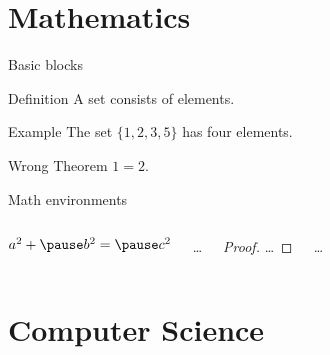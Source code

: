 \documentclass[aspectratio=1610,hyperref={pdfpagemode=FullScreen},english]{beamer} %
\begin{document}
\section{Mathematics}
\begin{frame}{Basic blocks}
  \begin{block}{Definition}
    A \alert{set} consists of elements.
  \end{block}
  \begin{exampleblock}{Example}
    The set $\{1,2,3,5\}$ has four elements.
  \end{exampleblock}
  \begin{alertblock}{Wrong Theorem}
    $1=2$.
  \end{alertblock}
\end{frame}
\begin{frame}{Math environments}
  \begin{columns}
      \begin{theorem}[Pythagorean]
        $a^{2}+ \pause b^{2}= \pause c^{2}$ 
      \end{theorem}
      \ldots
      \begin{proof}
        \ldots
      \end{proof}
      \ldots
  \end{columns}
\end{frame}
\section{Computer Science}
\end{document}
